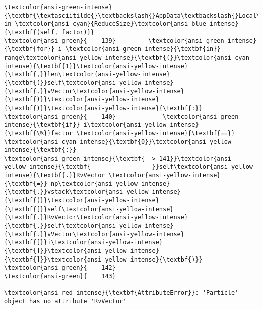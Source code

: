 \documentclass[11pt]{article}
\makeatletter
\newcommand{\boxspacing}{\kern\kvtcb@left@rule\kern\kvtcb@boxsep}
\newcommand{\prompt}[4]{
        {\ttfamily\llap{{\color{#2}[#3]:\hspace{3pt}#4}}\vspace{-\baselineskip}}
    }
\makeatother
\begin{document}
\begin{Verbatim}[commandchars=\\\{\}, frame=single, framerule=2mm, rulecolor=\color{outerrorbackground}]
\textcolor{ansi-green-intense}{\textbf{\textasciitilde{}\textbackslash{}AppData\textbackslash{}Local\textbackslash{}Temp/ipykernel\_12240/2143302627.py}} in \textcolor{ansi-cyan}{ReduceSize}\textcolor{ansi-blue-intense}{\textbf{(self, factor)}}
\textcolor{ansi-green}{    139}         \textcolor{ansi-green-intense}{\textbf{for}} i \textcolor{ansi-green-intense}{\textbf{in}} range\textcolor{ansi-yellow-intense}{\textbf{(}}\textcolor{ansi-cyan-intense}{\textbf{1}}\textcolor{ansi-yellow-intense}{\textbf{,}}len\textcolor{ansi-yellow-intense}{\textbf{(}}self\textcolor{ansi-yellow-intense}{\textbf{.}}vVector\textcolor{ansi-yellow-intense}{\textbf{)}}\textcolor{ansi-yellow-intense}{\textbf{)}}\textcolor{ansi-yellow-intense}{\textbf{:}}
\textcolor{ansi-green}{    140}             \textcolor{ansi-green-intense}{\textbf{if}} i\textcolor{ansi-yellow-intense}{\textbf{\%}}factor \textcolor{ansi-yellow-intense}{\textbf{==}} \textcolor{ansi-cyan-intense}{\textbf{0}}\textcolor{ansi-yellow-intense}{\textbf{:}}
\textcolor{ansi-green-intense}{\textbf{--> 141}}\textcolor{ansi-yellow-intense}{\textbf{                 }}self\textcolor{ansi-yellow-intense}{\textbf{.}}RvVector \textcolor{ansi-yellow-intense}{\textbf{=}} np\textcolor{ansi-yellow-intense}{\textbf{.}}vstack\textcolor{ansi-yellow-intense}{\textbf{(}}\textcolor{ansi-yellow-intense}{\textbf{[}}self\textcolor{ansi-yellow-intense}{\textbf{.}}RvVector\textcolor{ansi-yellow-intense}{\textbf{,}}self\textcolor{ansi-yellow-intense}{\textbf{.}}vVector\textcolor{ansi-yellow-intense}{\textbf{[}}i\textcolor{ansi-yellow-intense}{\textbf{]}}\textcolor{ansi-yellow-intense}{\textbf{]}}\textcolor{ansi-yellow-intense}{\textbf{)}}
\textcolor{ansi-green}{    142} 
\textcolor{ansi-green}{    143} 

\textcolor{ansi-red-intense}{\textbf{AttributeError}}: 'Particle' object has no attribute 'RvVector'
    \end{Verbatim}

    \begin{tcolorbox}[breakable, size=fbox, boxrule=1pt, pad at break*=1mm,colback=cellbackground, colframe=cellborder]
\prompt{In}{incolor}{ }{\boxspacing}
\begin{Verbatim}[commandchars=\\\{\}]

\end{Verbatim}
\end{tcolorbox}

    \begin{tcolorbox}[breakable, size=fbox, boxrule=1pt, pad at break*=1mm,colback=cellbackground, colframe=cellborder]
\prompt{In}{incolor}{ }{\boxspacing}
\begin{Verbatim}[commandchars=\\\{\}]

\end{Verbatim}
\end{tcolorbox}
\end{document}
